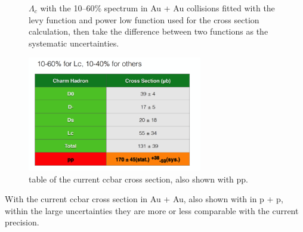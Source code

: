 \begin{figure}[htbp]
\begin{minipage}[htbp]{0.47\linewidth}
\caption{$\Lambda_{c}$ with the 10--60\% spectrum in Au + Au collisions fitted with the levy function and power low function used for the cross section calculation, then take the difference between two functions as the systematic uncertainties. \label{ccx_4}}
\end{minipage}
\end{figure}

\begin{figure}
\centering
\includegraphics[width=0.68\textwidth]{figure/Run14_D0HFT/ccx_5.png}
\caption{table of the current ccbar cross section, also shown with pp.}
\label{ccx_5} 
\end{figure}

With the current ccbar cross section in Au + Au, also shown with in p + p, within the large uncertainties they are more or less comparable with the current precision.

